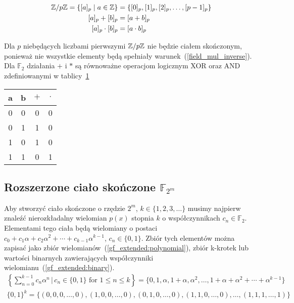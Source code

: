\begin{align}
    \mathbb{Z} / p \mathbb{Z} = \{ [a]_p \; | \; a \in \mathbb{Z} \} &= \{ [0]_p, [1]_p,
    [2]_p, \ldots, [p-1]_p \} \label{modulo_elements} \\
    [a]_p + [b]_p &= [a + b]_p \label{modulo_addition} \\
    [a]_p \cdot [b]_p &= [a \cdot b]_p \label{modulo_multiplication}
\end{align}

Dla $p$ niebędących liczbami pierwszymi $\mathbb{Z} / p \mathbb{Z}$ nie będzie
ciałem skończonym, ponieważ nie wszystkie elementy będą spełniały
warunek~(\ref{field_mul_inverse}).
Dla $\mathbb{F}_2$ działania $+$ i $*$ są równoważne operacjom logicznym XOR
oraz AND zdefiniowanymi w tablicy~\ref{truth_table:title}
\begin{table}
    \label{truth_table:title}
    \centering
    \begin{tabular}{c c | c c}
        \toprule
        a & b & $+$ & $\cdot$ \\
        \midrule
        0 & 0 & 0 & 0 \\
        \midrule
        0 & 1 & 1 & 0 \\
        \midrule
        1 & 0 & 1 & 0 \\
        \midrule
        1 & 1 & 0 & 1 \\
        \bottomrule
    \end{tabular}
\end{table}

\subsection{Rozszerzone ciało skończone $\mathbb{F}_{2^m}$}

Aby stworzyć ciało skończone o rzędzie $2^m$, $k \in \{ 1, 2, 3, \ldots \}$ musimy
najpierw znaleźć nierozkładalny wielomian $p(x)$ stopnia $k$ o współczynnikach
$c_{n} \in \mathbb{F}_{2}$.
Elementami tego ciała będą wielomiany o postaci $c_{0} + c_{1}\alpha + c_{2}\alpha^{2} +
    \cdots + c_{k-1}\alpha^{k-1}$, $c_{n} \in \{0, 1\}$.
Zbiór tych elementów można zapisać jako zbiór wielomianów~(\ref{gf_extended:polynomial}),
zbiór k-krotek lub wartości binarnych zawierających współczynniki
wielomianu~(\ref{gf_extended:binary}).
\begin{align}
    \left\{ \sum_{n=0}^{k-1} c_{n}\alpha^{n} \,|\, c_{n} \in \{0,1\} \text{ for } 1 \le n \le k \right\}
        = \{ 0, 1, \alpha, 1 + \alpha, \alpha^{2}, \ldots, 1 + \alpha + \alpha^2 + \cdots + \alpha^{k-1} \}
        \label{gf_extended:polynomial} \\
    \{ 0, 1 \}^{k} = \{ (0, 0, 0, \ldots, 0), (1, 0, 0, \ldots, 0), (0, 1, 0, \ldots, 0),
    (1, 1, 0, \ldots, 0), \ldots, (1, 1, 1, \ldots, 1) \} \label{gf_extended:binary}
\end{align}

